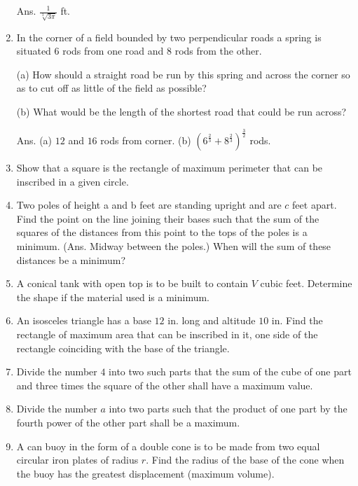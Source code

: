 \begin{enumerate}
Ans. $\frac{1}{\sqrt[3]{3\pi}}$ ft.

\item
In the corner of a field bounded by two perpendicular roads a spring 
is situated $6$ rods from one road and $8$ rods from the other. 

(a) How should a straight road be run by this spring and across the 
corner so as to cut off as little of the field as possible?

(b) What would be the length of the shortest road that could be run across?

Ans. (a) $12$ and $16$ rods from corner.
(b) $(6^{\frac{2}{3}} + 8^{\frac{2}{3}})^{\frac{3}{2}}$ rods.

\item
Show that a square is the rectangle of maximum perimeter that can be 
inscribed in a given circle.

\item
Two poles of height a and b feet are standing upright and are $c$ feet apart. 
Find the point on the line joining their bases such that the sum 
of the squares of the distances from this point to the tops of the poles is a minimum.
(Ans. Midway between the poles.)
When will the sum of these distances be a minimum?

\item
A conical tank with open top is to be built to contain $V$ cubic feet. 
Determine the shape if the material used is a minimum.

\item
An isosceles triangle has a base $12$ in. long and altitude $10$ in. 
Find the rectangle of maximum area that can be inscribed 
in it, one side of the rectangle coinciding with the base of the triangle.

\item
Divide the number $4$ into two such parts that the sum of the 
cube of one part and three times the square of the other shall have a maximum value.

\item
Divide the number $a$ into two parts such that the product of 
one part by the fourth power of the other part shall be a maximum.

\item
A can buoy in the form of a double cone is to be made from two equal 
circular iron plates of radius $r$. Find the radius of the base of the cone 
when the buoy has the greatest displacement (maximum volume).


\end{enumerate}
